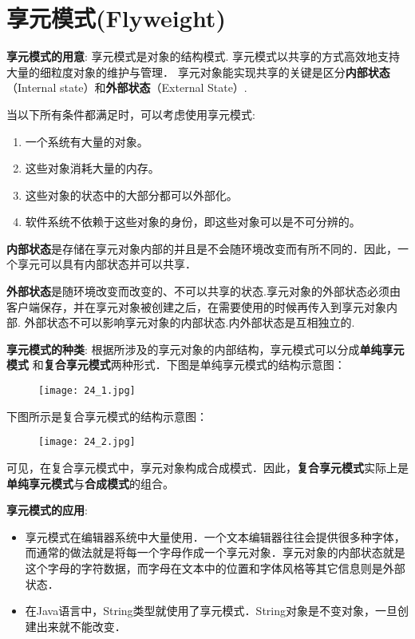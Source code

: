 \documentclass[../main.tex]{subfiles}
\begin{document}
\section{享元模式(Flyweight)}
\textbf{享元模式的用意}:
享元模式是对象的结构模式. 享元模式以共享的方式高效地支持大量的细粒度对象的维护与管理．
享元对象能实现共享的关键是区分\textbf{内部状态}（Internal  state）和\textbf{外部状态}（External State）.

当以下所有条件都满足时，可以考虑使用享元模式:
\begin{enumerate}
  \item 一个系统有大量的对象。
  \item 这些对象消耗大量的内存。
  \item 这些对象的状态中的大部分都可以外部化。
  \item 软件系统不依赖于这些对象的身份，即这些对象可以是不可分辨的。
\end{enumerate}
%
\textbf{内部状态}是存储在享元对象内部的并且是不会随环境改变而有所不同的．因此，一个享元可以具有内部状态并可以共享．

\textbf{外部状态}是随环境改变而改变的、不可以共享的状态.享元对象的外部状态必须由客户端保存，并在享元对象被创建之后，在需要使用的时候再传入到享元对象内部.
外部状态不可以影响享元对象的内部状态.内外部状态是互相独立的.

\textbf{享元模式的种类}:
根据所涉及的享元对象的内部结构，享元模式可以分成\textbf{单纯享元模式}
和\textbf{复合享元模式}两种形式．下图是单纯享元模式的结构示意图：
%
\begin{figure}[H]
  \texttt{[image: 24\_1.jpg]}
\end{figure}
%
下图所示是复合享元模式的结构示意图：
%
\begin{figure}[H]
  \texttt{[image: 24\_2.jpg]}
\end{figure}
%
可见，在复合享元模式中，享元对象构成合成模式．因此，\textbf{复合享元模式}实际上是\textbf{单纯享元模式}与\textbf{合成模式}的组合。

\textbf{享元模式的应用}:
\begin{itemize}
  \item 享元模式在编辑器系统中大量使用．一个文本编辑器往往会提供很多种字体，而通常的做法就是将每一个字母作成一个享元对象．享元对象的内部状态就是这个字母的字符数据，而字母在文本中的位置和字体风格等其它信息则是外部状态．
  \item 在Java语言中，String类型就使用了享元模式．String对象是不变对象，一旦创建出来就不能改变．
\end{itemize}
%
\end{document}
